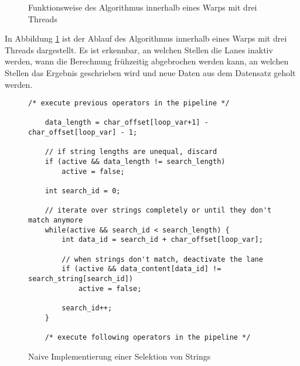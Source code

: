 \begin{figure}[]
	\caption{Funktionsweise des Algorithmus innerhalb eines Warps mit drei Threads}
	\label{equals_naiv_algorithmus}
\end{figure}

In Abbildung \ref{equals_naiv_algorithmus} ist der Ablauf des Algorithmus innerhalb eines Warps mit drei Threads dargestellt.
Es ist erkennbar, an welchen Stellen die Lanes inaktiv werden, wann die Berechnung frühzeitig abgebrochen werden kann, an welchen Stellen das Ergebnis geschrieben wird und neue Daten aus dem Datensatz geholt werden.

\newpage

\begin{figure}[]
	\begin{lstlisting}[language=MyC++]
	/* execute previous operators in the pipeline */
	
	data_length = char_offset[loop_var+1] - char_offset[loop_var] - 1;
	
	// if string lengths are unequal, discard
	if (active && data_length != search_length)
		active = false;
	
	int search_id = 0;
	
	// iterate over strings completely or until they don't match anymore
	while(active && search_id < search_length) {
		int data_id = search_id + char_offset[loop_var];
		
		// when strings don't match, deactivate the lane
		if (active && data_content[data_id] != search_string[search_id])
			active = false;
		
		search_id++;
	}
	
	/* execute following operators in the pipeline */
	\end{lstlisting}
	\caption{Naive Implementierung einer Selektion von Strings}
	\label{naive_equals}
\end{figure}

